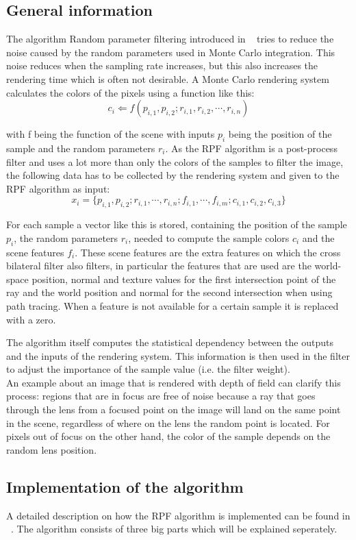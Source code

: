 \subsection{General information}
The algorithm Random parameter filtering introduced in ~\cite{RPF11} tries to reduce the noise caused by the random parameters used in Monte Carlo integration.
This noise reduces when the sampling rate increases, but this also increases the rendering time which is often not desirable.
A Monte Carlo rendering system calculates the colors of the pixels using a function like this:
\[
 c_i \Leftarrow f(p_{i,1},p_{i,2};r_{i,1},r_{i,2},\cdots,r_{i,n})
\]

with f being the function of the scene with inputs $p_i$ being the position of the sample and the random parameters $r_i$.
As the RPF algorithm is a post-process filter and uses a lot more than only the colors of the samples to filter the image, the following data has to be collected by the rendering system and given to the RPF algorithm as input:
\[
 x_i = \{p_{i,1},p_{i,2};r_{i,1},\cdots,r_{i,n};f_{i,1},\cdots,f_{i,m};c_{i,1},c_{i,2},c_{i,3}\}
\]

For each sample a vector like this is stored, containing the position of the sample $p_i$, the random parameters $r_i$, needed to compute the sample colors $c_i$ and the scene features $f_i$.
These scene features are the extra features on which the cross bilateral filter also filters, in particular the features that are used are
the world-space position, normal and texture values for the first intersection point of the ray and the world position and normal for the second intersection when using path tracing.
When a feature is not available for a certain sample it is replaced with a zero.

The algorithm itself computes the statistical dependency between the outputs and the inputs of the rendering system.
This information is then used in the filter to adjust the importance of the sample value (i.e. the filter weight).
\\
An example about an image that is rendered with depth of field can clarify this process:
regions that are in focus are free of noise because a ray that goes through the lens from a focused point on the image will land on the same point in the scene, regardless of where on the lens the random point is located.
For pixels out of focus on the other hand, the color of the sample depends on the random lens position.

\subsection{Implementation of the algorithm}
A detailed description on how the RPF algorithm is implemented can be found in ~\cite{RPFTechReport}.
The algorithm consists of three big parts which will be explained seperately.

